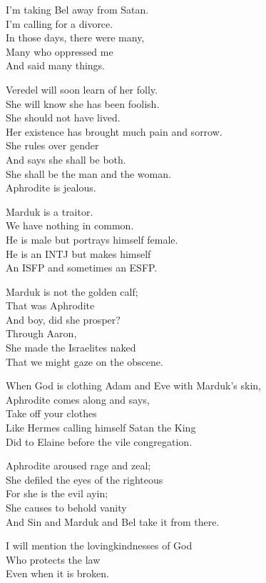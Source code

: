 \documentclass[
]{book}
\begin{document}
I'm taking Bel away from Satan.\\
I'm calling for a divorce.\\
In those days, there were many,\\
Many who oppressed me\\
And said many things.

Veredel will soon learn of her folly.\\
She will know she has been foolish.\\
She should not have lived.\\
Her existence has brought much pain and sorrow.\\
She rules over gender\\
And says she shall be both.\\
She shall be the man and the woman.\\
Aphrodite is jealous.

Marduk is a traitor.\\
We have nothing in common.\\
He is male but portrays himself female.\\
He is an INTJ but makes himself\\
An ISFP and sometimes an ESFP.

Marduk is not the golden calf;\\
That was Aphrodite\\
And boy, did she prosper?\\
Through Aaron,\\
She made the Israelites naked\\
That we might gaze on the obscene.

When God is clothing Adam and Eve with Marduk's skin,\\
Aphrodite comes along and says,\\
Take off your clothes\\
Like Hermes calling himself Satan the King\\
Did to Elaine before the vile congregation.

Aphrodite aroused rage and zeal;\\
She defiled the eyes of the righteous\\
For she is the evil ayin;\\
She causes to behold vanity\\
And Sin and Marduk and Bel take it from there.

I will mention the lovingkindnesses of God\\
Who protects the law\\
Even when it is broken.
\end{document}
